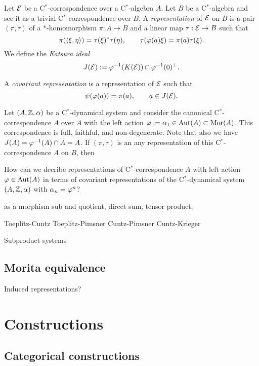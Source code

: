 \documentclass{../../large}
\begin{document}
\begin{prb}
Let $\mathcal{E}$ be a C$^*$-correspondence over a C$^*$-algebra $A$.
Let $B$ be a C$^*$-algebra and see it as a trivial C$^*$-correspondence over $B$.
A \emph{representation} of $\mathcal{E}$ on $B$ is a pair $(\pi,\tau)$ of a $*$-homomorphism $\pi:A\to B$ and a linear map $\tau:\mathcal{E}\to B$ such that
\[\pi(\langle\xi,\eta\rangle)=\tau(\xi)^*\tau(\eta),\qquad\tau(\varphi(a)\xi)=\pi(a)\tau(\xi).\]
We define the \emph{Katsura ideal}
\[J(\mathcal{E}):=\varphi^{-1}(K(\mathcal{E}))\cap\varphi^{-1}(0)^\perp.\]

A \emph{covariant representation} is a representation of $\mathcal{E}$ such that
\[\psi(\varphi(a))=\pi(a),\qquad a\in J(\mathcal{E}).\]
\begin{parts}
\item
Let $(A,\mathbb{Z},\alpha)$ be a C$^*$-dynamical system and consider the canonical C$^*$-correspondence $A$ over $A$ with the left action $\varphi:=\alpha_1\in\operatorname{Aut}(A)\subset\operatorname{Mor}(A)$.
This correspondence is full, faithful, and non-degenerate.
Note that also we have $J(A)=\varphi^{-1}(A)\cap A=A$.
If $(\pi,\tau)$ is an any representation of this C$^*$-correspondence $A$ on $B$, then 
\end{parts}
\end{prb}

How can we decribe representations of C$^*$-correspondence $A$ with left action $\varphi\in\operatorname{Aut}(A)$ in terms of covariant representations of the C$^*$-dynamical system $(A,\mathbb{Z},\alpha)$ with $\alpha_n=\varphi^n$?



as a morphism
sub and quotient, direct sum, tensor product,

Toeplitz-Cuntz
Toeplitz-Pimsner
Cuntz-Pimsner
Cuntz-Krieger



Subproduct systems


\section{Morita equivalence}



Induced representations?







\chapter{Constructions}


\section{Categorical constructions}
\end{document}
